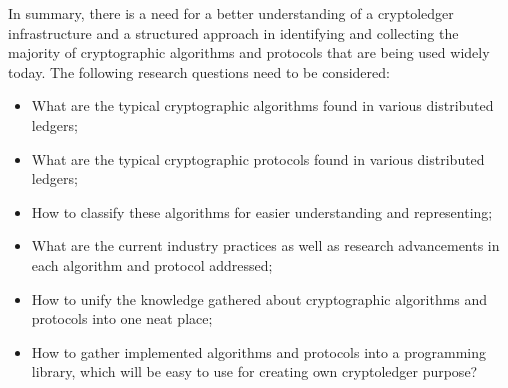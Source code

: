 \documentclass[12pt]{article}
\begin{document}
In summary, there is a need for a better understanding of a
cryptoledger infrastructure and a structured approach in identifying and
collecting the majority of cryptographic algorithms and protocols that are
being used widely today. The following research questions
need to be considered:
\begin{itemize}
    \item What are the typical cryptographic algorithms found in various distributed ledgers;
    \item What are the typical cryptographic protocols found in various distributed ledgers;
    \item How to classify these algorithms for easier understanding and representing;
    \item What are the current industry practices as well as research advancements in each algorithm and protocol addressed;
    \item How to unify the knowledge gathered about cryptographic algorithms and protocols into one neat place;
    \item How to gather implemented algorithms and protocols into a programming
          library, which will be easy to use for creating own cryptoledger
          purpose?
\end{itemize}
\end{document}

